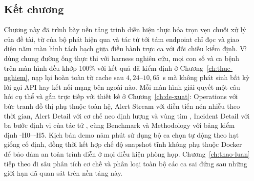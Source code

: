 \subsection{Kết chương}
\label{sec:ch6-ket-chuong}

Chương này đã trình bày nền tảng trình diễn hiện thực hóa trọn vẹn chuỗi xử lý của đề tài, từ  của bộ phát hiện qua \CTAV{} và tác tử  tới tám endpoint chỉ đọc và giao diện năm màn hình tách bạch giữa điều hành trực ca với đối chiếu kiểm định. Vì dùng chung đường ống thực thi với harness nghiên cứu, mọi con số và ca bệnh trên màn hình đều khớp $100\%$ với kết quả đã kiểm định ở Chương~\ref{ch:thuc-nghiem}, nạp lại hoàn toàn từ cache sau $4{,}24$--$10{,}65$~s mà không phát sinh bất kỳ lời gọi API hay kết nối mạng bên ngoài nào. Mỗi màn hình giải quyết một câu hỏi cụ thể và gắn trực tiếp với thiết kế ở Chương~\ref{ch:de-xuat}: Operations với bức tranh đồ thị phụ thuộc toàn hệ, Alert Stream với diễn tiến nén nhiễu theo thời gian, Alert Detail với cơ chế neo định lượng  và vùng tìm , Incident Detail với ba bước định vị của tác tử , cùng Benchmark và Methodology với bảng kiểm định \hyp{H0}--\hyp{H5}. Kịch bản demo năm phút sử dụng bộ ca chọn tự động theo hạt giống cố định, đồng thời kết hợp chế độ snapshot tĩnh không phụ thuộc Docker để bảo đảm an toàn trình diễn ở mọi điều kiện phòng họp. Chương~\ref{ch:thao-luan} tiếp theo đi sâu phân tích cơ chế và phân loại toàn bộ các ca sai đứng sau những giới hạn đã quan sát trên nền tảng này.
